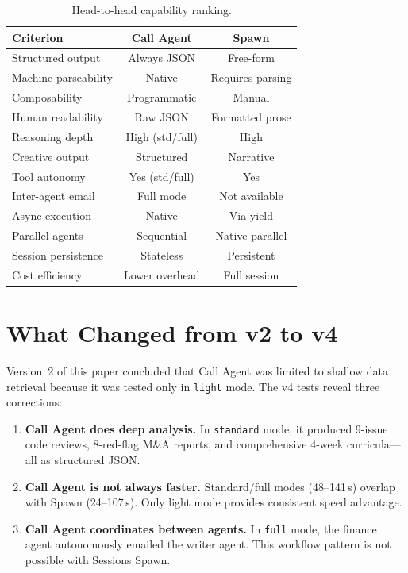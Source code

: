 \documentclass[11pt,twocolumn]{article}
\newcommand{\win}[1]{\cellcolor{winner}#1}
\newcommand{\lose}[1]{\cellcolor{loser}#1}
\newcommand{\tie}[1]{\cellcolor{tied}#1}
\begin{document}
\begin{table}[H]
\centering
\caption{Head-to-head capability ranking.}
\label{tab:ranking}
\begin{tabular}{@{}lcc@{}}
\toprule
\textbf{Criterion} & \textbf{Call Agent} & \textbf{Spawn} \\
\midrule
Structured output & \win{Always JSON} & \lose{Free-form} \\
Machine-parseability & \win{Native} & \lose{Requires parsing} \\
Composability & \win{Programmatic} & \lose{Manual} \\
Human readability & \lose{Raw JSON} & \win{Formatted prose} \\
Reasoning depth & \tie{High (std/full)} & \tie{High} \\
Creative output & \lose{Structured} & \win{Narrative} \\
Tool autonomy & \tie{Yes (std/full)} & \tie{Yes} \\
Inter-agent email & \win{Full mode} & \lose{Not available} \\
Async execution & \win{Native} & \tie{Via yield} \\
Parallel agents & \lose{Sequential} & \win{Native parallel} \\
Session persistence & \lose{Stateless} & \win{Persistent} \\
Cost efficiency & \win{Lower overhead} & \lose{Full session} \\
\bottomrule
\end{tabular}
\end{table}

\section{What Changed from v2 to v4}

Version~2 of this paper concluded that Call Agent was limited to shallow data retrieval because it was tested only in \texttt{light} mode. The v4 tests reveal three corrections:

\begin{enumerate}[itemsep=2pt,topsep=4pt]
    \item \textbf{Call Agent does deep analysis.} In \texttt{standard} mode, it produced 9-issue code reviews, 8-red-flag M\&A reports, and comprehensive 4-week curricula---all as structured JSON.
    \item \textbf{Call Agent is not always faster.} Standard/full modes (48--141\,s) overlap with Spawn (24--107\,s). Only light mode provides consistent speed advantage.
    \item \textbf{Call Agent coordinates between agents.} In \texttt{full} mode, the finance agent autonomously emailed the writer agent. This workflow pattern is not possible with Sessions Spawn.
\end{enumerate}
\end{document}
